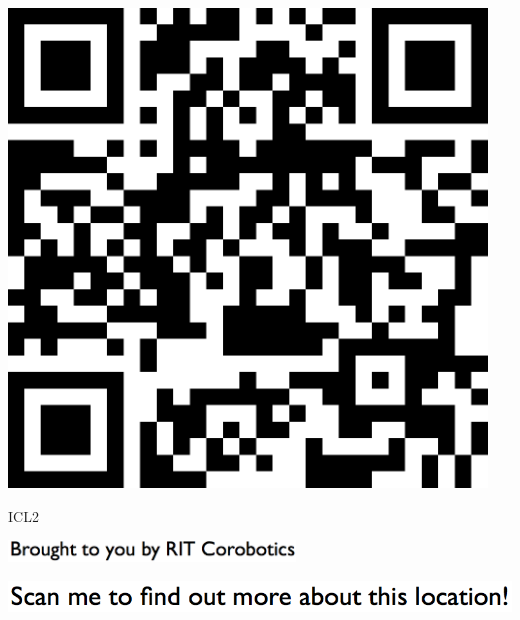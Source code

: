 \documentclass[letterpaper]{article}
\begin{document}
 \begingroup 
 \centerline{\includegraphics[scale=1,width=5in,height=5in]{ICL2.png}} 
 \endgroup 
 \vspace*{\fill} 

 \hfill{\small ICL2} 

  \vspace{0.7in} 
 
 \centerline{\includegraphics[scale=1,width=3in]{text-bottom.png}} 
 
 \pagebreak 
{} 
 \vspace*{\fill} 
 
  \centerline{\includegraphics[scale=1,width=6in]{text-top.png}} 
 
 \vspace{0.5in} 
 
\end{document}
